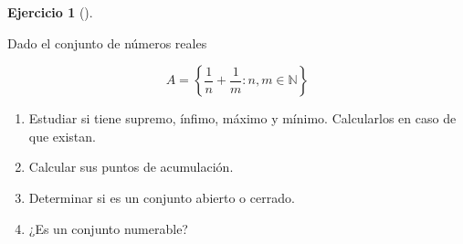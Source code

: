 \documentclass[
  spanish,
  a4paper,
]{scrreport}
\providecommand{\tightlist}{%
  \setlength{\itemsep}{0pt}\setlength{\parskip}{0pt}}
\theoremstyle{definition}
\newtheorem{exercise}{Ejercicio}[chapter]
\theoremstyle{remark}
\begin{document}
\begin{exercise}[]\protect\hypertarget{exr-4}{}\label{exr-4}

Dado el conjunto de números reales

\[
A = \left\{ \frac{1}{n} + \frac{1}{m} : n, m \in \mathbb{N} \right\}
\]

\begin{enumerate}
\def\labelenumi{\alph{enumi}.}
\tightlist
\item
  Estudiar si tiene supremo, ínfimo, máximo y mínimo. Calcularlos en
  caso de que existan.
\item
  Calcular sus puntos de acumulación.
\item
  Determinar si es un conjunto abierto o cerrado.
\item
  ¿Es un conjunto numerable?
\end{enumerate}

\end{exercise}
\end{document}
